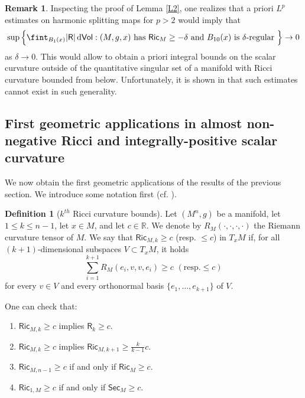 \documentclass[10pt]{article}
\theoremstyle{definition}
\newtheorem{definition}[thm]{Definition}
\newtheorem{remark}[thm]{Remark}
\newcommand{\bb}[1]{\mathbb{#1}}
\newcommand{\ssf}[1]{\mathsf{#1}}
\newcommand{\Ric}{\mathsf{Ric}}
\newcommand{\R}{\mathsf{R}}
\newcommand{\de}{{\rm d}}
\begin{document}
\begin{remark} \label{R5}
    Inspecting the proof of Lemma \ref{L2}, one realizes that a priori $L^p$ estimates on harmonic splitting maps for $p>2$ would imply that
    \[
    \sup \Big\{\fint_{B_1(x)} |\R| \, \de \ssf{Vol} : (M,g,x) \text{ has } \Ric_{M} \geq -\delta \text{ and } B_{10}(x) \text{ is } \delta \text{-regular }
    \Big\} \to 0
    \]
    as $\delta \to 0$.
    This would allow to obtain a priori integral bounds on the scalar curvature outside of the quantitative singular set of a manifold with Ricci curvature bounded from below.
    Unfortunately, it is shown in \cite{DephilippisHarmonic} that such estimates cannot exist in such generality.
\end{remark}

\subsection{First geometric  applications in almost non-negative Ricci and integrally-positive scalar curvature} \label{S4}

We now obtain the first geometric applications of the results of the previous section. We introduce some notation first (cf. \cite{ShenKricci}).

\begin{definition}[$k^{th}$ Ricci curvature bounds]
    Let $(M^n,g)$ be a manifold, let $1 \leq k \leq n-1$, let $x \in M$, and let $c \in \bb{R}$. We denote by $R_M(\cdot,\cdot,\cdot,\cdot)$ the Riemann curvature tensor of $M$. We say that $\Ric_{M,k} \geq c$ (resp. $\leq c$) in $T_xM$ if, for all $(k+1)$-dimensional subspaces $V \subset T_xM$, it holds
\[
\sum_{i=1}^{k+1} R_M(e_i,v,v,e_i) \geq c \, 
 \,(\text{resp.} \leq c)
\]
for every $v \in V$ and every orthonormal basis $\{e_1,\dots,e_{k+1}\}$ of $V$.
\end{definition}

One can check that:
\begin{enumerate}
    \item $\Ric_{M,k} \geq c$ implies $\R_k \geq c$.
    \item $\Ric_{M,k} \geq c$ implies $\Ric_{M,k+1} \geq \frac{k}{k-1} c$.
    \item $\Ric_{M,n-1} \geq c$ if and only if $\Ric_{M} \geq c$.
    \item $\Ric_{1,M} \geq c$ if and only if $\ssf{Sec}_{M} \geq c$.
\end{enumerate} 
\end{document}
